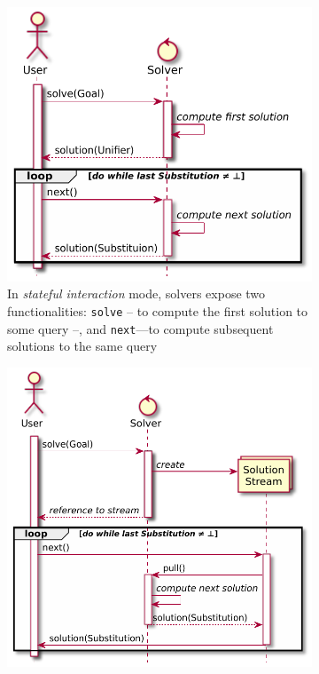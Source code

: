 \documentclass[12pt,a4paper,openright,twoside]{book}
\begin{document}
\begin{figure}
    \centering
    \caption{Interaction modes between logic solvers and users or KB}
    \label{fig:user-solver-interaction}
    \begin{subfigure}{0.48\linewidth}\centering
        \includegraphics[width=\linewidth]{figures/stateful-solver.pdf}
        \caption{In \emph{stateful interaction} mode, solvers expose two functionalities: \texttt{solve} -- to compute the first solution to some query --, and \texttt{next}---to compute subsequent solutions to the same query}
        \label{fig:user-solver-interaction:stateful}
    \end{subfigure}
    \hfill
    \begin{subfigure}{0.48\linewidth}\centering
        \includegraphics[width=\linewidth]{figures/streamful-solver.pdf}

\end{subfigure}
\end{figure}
\end{document}
